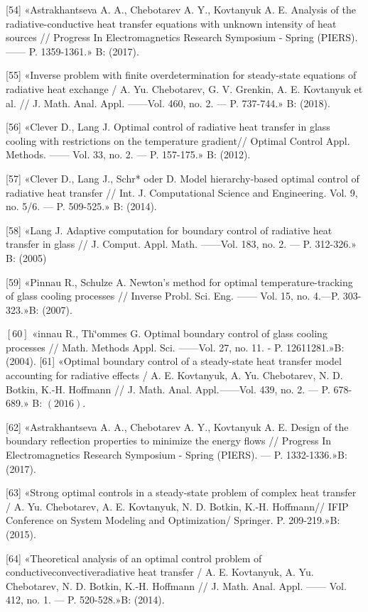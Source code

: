 \documentclass[10pt]{article}
\begin{document}
[54] «Astrakhantseva A. A., Chebotarev A. Y., Kovtanyuk A. E. Analysis of the radiative-conductive heat transfer equations with unknown intensity of heat sources // Progress In Electromagnetics Research Symposium - Spring (PIERS). —— P. 1359-1361.» B: (2017).

[55] «Inverse problem with finite overdetermination for steady-state equations of radiative heat exchange / A. Yu. Chebotarev, G. V. Grenkin, A. E. Kovtanyuk et al. // J. Math. Anal. Appl. ——Vol. 460, no. 2. — P. 737-744.» B: (2018).

[56] «Clever D., Lang J. Optimal control of radiative heat transfer in glass cooling with restrictions on the temperature gradient// Optimal Control Appl. Methods. —— Vol. 33, no. 2. — P. 157-175.» B: (2012).

[57] «Clever D., Lang J., Schr* oder D. Model hierarchy-based optimal control of radiative heat transfer // Int. J. Computational Science and Engineering. Vol. 9, no. 5/6. — P. 509-525.» B: (2014).

[58] «Lang J. Adaptive computation for boundary control of radiative heat transfer in glass // J. Comput. Appl. Math. ——Vol. 183, no. 2. — P. 312-326.» B: (2005)

[59] «Pinnau R., Schulze A. Newton's method for optimal temperature-tracking of glass cooling processes // Inverse Probl. Sci. Eng. —— Vol. 15, no. 4.—P. 303-323.»B: (2007).

$[60]$ «innau R., Th`̈ommes G. Optimal boundary control of glass cooling processes // Math. Methods Appl. Sci. ——Vol. 27, no. 11. - P. 12611281.»B: (2004). [61] «Optimal boundary control of a steady-state heat transfer model accounting for radiative effects / A. E. Kovtanyuk, A. Yu. Chebotarev, N. D. Botkin, K.-H. Hoffmann // J. Math. Anal. Appl.——Vol. 439, no. 2. — P. 678-689.» B: $(2016)$.

[62] «Astrakhantseva A. A., Chebotarev A. Y., Kovtanyuk A. E. Design of the boundary reflection properties to minimize the energy flows // Progress In Electromagnetics Research Symposium - Spring (PIERS). — P. 1332-1336.»B: (2017).

[63] «Strong optimal controls in a steady-state problem of complex heat transfer / A. Yu. Chebotarev, A. E. Kovtanyuk, N. D. Botkin, K.-H. Hoffmann// IFIP Conference on System Modeling and Optimization/ Springer. P. 209-219.»B: (2015).

[64] «Theoretical analysis of an optimal control problem of conductiveconvectiveradiative heat transfer / A. E. Kovtanyuk, A. Yu. Chebotarev, N. D. Botkin, K.-H. Hoffmann // J. Math. Anal. Appl. —— Vol. 412, no. 1. — P. 520-528.»B: (2014).
\end{document}

